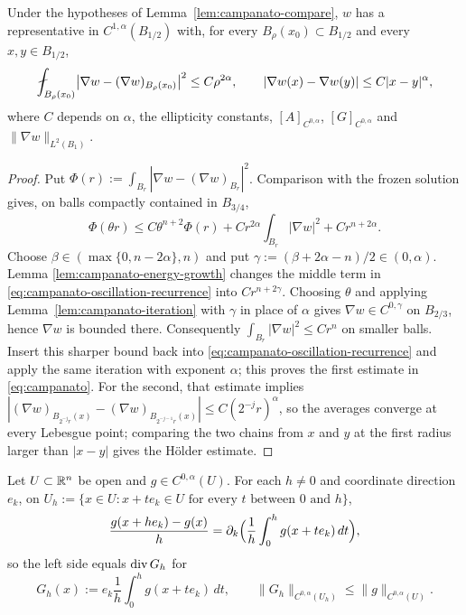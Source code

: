 \begin{theorem}
\label{thm:campanato}
Under the hypotheses of Lemma~\ref{lem:campanato-compare}, $w$ has a
representative in $C^{1,\alpha}(B_{1/2})$ with, for every
$B_\rho(x_0)\subset B_{1/2}$ and every $x,y\in B_{1/2}$,
\begin{equation}\label{eq:campanato}
  \avg_{B_\rho(x_0)}\bigl|\nabla w-(\nabla w)_{B_\rho(x_0)}\bigr|^2
  \le C\rho^{2\alpha},
  \qquad
  |\nabla w(x)-\nabla w(y)|\le C|x-y|^\alpha ,
\end{equation}
where $C$ depends on $\alpha$, the ellipticity constants,
$[A]_{C^{0,\alpha}}$, $[G]_{C^{0,\alpha}}$ and $\|\nabla w\|_{L^2(B_1)}$.
\end{theorem}

\begin{proof}
Put
$\Phi(r):=\int_{B_r}|\nabla w-(\nabla w)_{B_r}|^2$.  Comparison with the
frozen solution gives, on balls compactly contained in $B_{3/4}$,
\begin{equation}\label{eq:campanato-oscillation-recurrence}
 \Phi(\theta r)
 \le C\theta^{n+2}\Phi(r)
    +Cr^{2\alpha}\int_{B_r}|\nabla w|^2+Cr^{n+2\alpha}.
\end{equation}
Choose
$\beta\in(\max\{0,n-2\alpha\},n)$ and put
$\gamma:=(\beta+2\alpha-n)/2\in(0,\alpha)$.  Lemma
\ref{lem:campanato-energy-growth} changes the middle term in
\eqref{eq:campanato-oscillation-recurrence} into $Cr^{n+2\gamma}$.
Choosing $\theta$ and applying Lemma~\ref{lem:campanato-iteration} with
$\gamma$ in place of $\alpha$ gives $\nabla w\in C^{0,\gamma}$ on
$B_{2/3}$, hence $\nabla w$ is bounded there.  Consequently
$\int_{B_r}|\nabla w|^2\le Cr^n$ on smaller balls.  Insert this sharper bound
back into \eqref{eq:campanato-oscillation-recurrence} and apply the same
iteration with exponent $\alpha$; this proves the first estimate in
\eqref{eq:campanato}.  For the second, that estimate implies
$|(\nabla w)_{B_{2^{-j}r}(x)}-(\nabla w)_{B_{2^{-j-1}r}(x)}|\le C(2^{-j}r)^\alpha$,
so the averages converge at every Lebesgue point; comparing the two chains
from $x$ and $y$ at the first radius larger than $|x-y|$ gives the H\"older
estimate.
\end{proof}

\begin{lemma}\label{lem:Gh}
Let $U\subset\mathbb R^n$ be open and $g\in C^{0,\alpha}(U)$.  For each $h\ne0$
and coordinate direction $e_k$, on
$U_h:=\{x\in U:x+te_k\in U\text{ for every }t\text{ between }0\text{ and }h\}$,
\[
  \frac{g(x+he_k)-g(x)}{h}
  =\partial_k\Bigl(\frac1h\int_0^hg(x+te_k)\,dt\Bigr),
\]
so the left side equals $\operatorname{div} G_h$ for
\[
 G_h(x):=e_k\frac1h\int_0^hg(x+te_k)\,dt,
 \qquad
 \|G_h\|_{C^{0,\alpha}(U_h)}\le\|g\|_{C^{0,\alpha}(U)}.
\]
\end{lemma}

